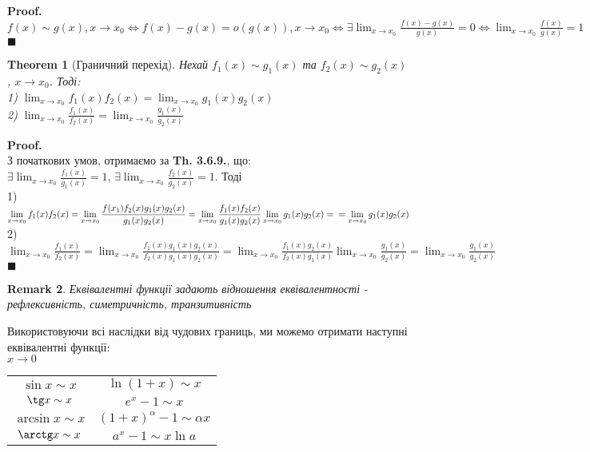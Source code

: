 \documentclass[a4paper, 14pt]{extarticle}
\def\huge{\displaystyle}
\theoremstyle{theoremdd}
\newtheorem{theorem}{Theorem}[subsection]
\theoremstyle{theoremdd}
\theoremstyle{theoremdd}
\theoremstyle{theoremdd}
\theoremstyle{theoremdd}
\theoremstyle{theoremdd}
\newtheorem{remark}[theorem]{Remark}
\theoremstyle{theoremdd}
\theoremstyle{theoremdd}
\newenvironment{pf}{\vspace*{-3mm} \textbf{Proof. \\}}{$\blacksquare$}
\begin{document}
\begin{pf}
$f(x) \sim g(x), x \to x_0 \iff f(x) - g(x) = o(g(x)), x \to x_0 \iff \huge \exists \lim_{x \to x_0} \frac{f(x)-g(x)}{g(x)} = 0 \iff \lim_{x \to x_0} \frac{f(x)}{g(x)} = 1$
\end{pf}

\begin{theorem}[Граничний перехід]
Нехай $f_1(x) \sim g_1(x)$ та $f_2(x) \sim g_2(x)$, $x \to x_0$. Тоді:\\
1) $\huge \lim_{x \to x_0} f_1(x) f_2(x) = \lim_{x \to x_0} g_1(x) g_2(x)$\\
2) $\huge \lim_{x \to x_0} \frac{f_1(x)}{f_2(x)} = \lim_{x \to x_0} \frac{g_1(x)}{g_2(x)}$
\end{theorem}

\begin{pf}
З початкових умов, отримаємо за \textbf{Th. 3.6.9.}, що:\\
$\huge \exists \lim_{x \to x_0} \frac{f_1(x)}{g_1(x)} = 1$, $\huge \exists \lim_{x \to x_0} \frac{f_2(x)}{g_2(x)} = 1$. Тоді\\
1) $\huge \lim_{x \to x_0} f_1(x) f_2(x) = \lim_{x \to x_0} \frac{f(x_1) f_2(x) g_1(x) g_2(x)}{g_1(x) g_2(x)} = \lim_{x \to x_0} \frac{f_1(x) f_2(x)}{g_1(x) g_2(x)} \lim_{x \to x_0} g_1(x) g_2(x) = \\ = \lim_{x \to x_0} g_1(x) g_2(x)$\\
2) $\huge \lim_{x \to x_0} \frac{f_1(x)}{f_2(x)} = \lim_{x \to x_0} \frac{f_1(x)g_1(x)g_2(x)}{f_2(x)g_1(x)g_2(x)} = \lim_{x \to x_0} \frac{f_1(x)g_2(x)}{f_2(x)g_1(x)} \lim_{x \to x_0} \frac{g_1(x)}{g_2(x)} = \lim_{x \to x_0} \frac{g_1(x)}{g_2(x)}$
\end{pf}

\begin{remark}
Еквівалентні функції задають відношення еквівалентності - рефлексивність, симетричність, транзитивність
\end{remark}

Використовуючи всі наслідки від чудових границь, ми можемо отримати наступні еквівалентні функції:\\
$x \to 0$
\begin{center}
\begin{tabular}{ c c }
 $\sin x \sim x$ & $\ln(1+x) \sim x$ \\ 
 $\tg x \sim x$ & $e^x - 1 \sim x$ \\
 $\arcsin x \sim x$ & $(1+x)^\alpha - 1 \sim \alpha x$ \\
 $\arctg x \sim x$ & $a^x - 1 \sim x \ln a$ \\ 
\end{tabular}
\end{center}
\end{document}
